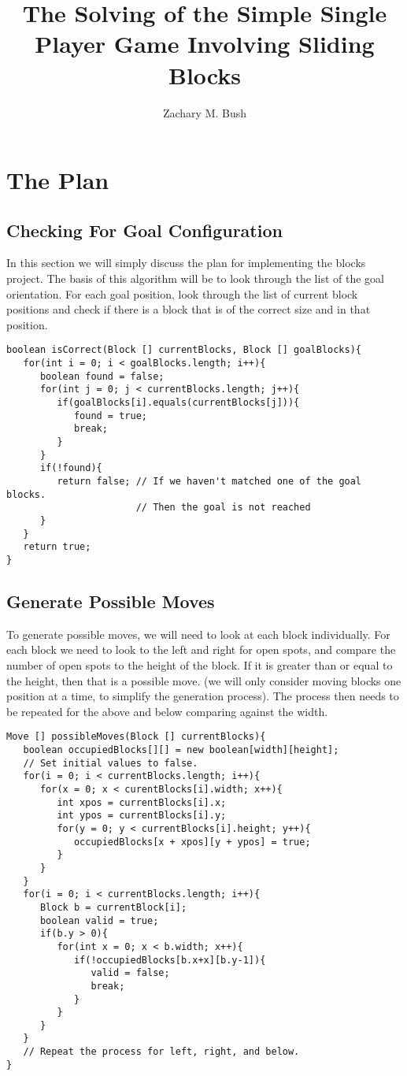 \documentclass[a4paper]{article}
\begin{document}
\title{The Solving of the Simple Single Player Game Involving Sliding Blocks}
\author{Zachary M. Bush}
\maketitle
\tableofcontents
\lstlistoflistings
\newpage
\section{The Plan}
\subsection{Checking For Goal Configuration}
In this section we will simply discuss the plan for implementing the blocks 
project. The basis of this algorithm will be to look through the list of the 
goal orientation. For each goal position, look through the list of current 
block positions and check if there is a block that is of the correct size and 
in that position. 
\begin{lstlisting}[caption=Checking for Goal Configuration]
boolean isCorrect(Block [] currentBlocks, Block [] goalBlocks){
   for(int i = 0; i < goalBlocks.length; i++){
      boolean found = false;
      for(int j = 0; j < currentBlocks.length; j++){
         if(goalBlocks[i].equals(currentBlocks[j])){
            found = true;
            break;
         }
      }
      if(!found){
         return false; // If we haven't matched one of the goal blocks. 
                       // Then the goal is not reached
      }
   }
   return true;
}
\end{lstlisting}
\subsection{Generate Possible Moves}
To generate possible moves, we will need to look at each block individually. 
For each block we need to look to the left and right for open spots, and 
compare the number of open spots to the height of the block. If it is greater 
than or equal to the height, then that is a possible move. (we will only 
consider moving blocks one position at a time, to simplify the generation 
process). The process then needs to be repeated for the above and below 
comparing against the width. 
\begin{lstlisting}[caption=Generate Possible Moves]
Move [] possibleMoves(Block [] currentBlocks){
   boolean occupiedBlocks[][] = new boolean[width][height];
   // Set initial values to false.
   for(i = 0; i < currentBlocks.length; i++){
      for(x = 0; x < curentBlocks[i].width; x++){
         int xpos = currentBlocks[i].x;
         int ypos = currentBlocks[i].y;
         for(y = 0; y < currentBlocks[i].height; y++){
            occupiedBlocks[x + xpos][y + ypos] = true;
         }
      }
   }
   for(i = 0; i < currentBlocks.length; i++){
      Block b = currentBlock[i];
      boolean valid = true;
      if(b.y > 0){
         for(int x = 0; x < b.width; x++){
            if(!occupiedBlocks[b.x+x][b.y-1]){
               valid = false;
               break;
            }
         }
      }
   }
   // Repeat the process for left, right, and below. 
}
\end{lstlisting}
\end{document}

